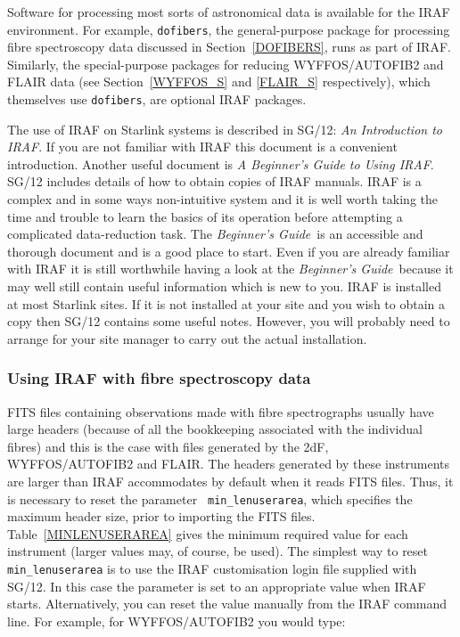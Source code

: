\documentclass[twoside,11pt]{article}
\newcommand{\xref}[3]{#1}
\begin{document}
Software for processing most sorts of astronomical data is available
for the IRAF environment.  For example, {\tt dofibers}, the
general-purpose package for processing fibre spectroscopy data
discussed in Section~\ref{DOFIBERS}, runs as part of IRAF.  Similarly,
the special-purpose packages for reducing WYFFOS/AUTOFIB2 and FLAIR
data (see Section~\ref{WYFFOS_S} and \ref{FLAIR_S} respectively),
which themselves use {\tt dofibers}, are optional IRAF packages.

The use of IRAF on Starlink systems is described in 
\xref{SG/12: {\it An Introduction to IRAF}}{sg12}{}\/\cite{SG12}.
If you are not familiar with IRAF this document is a convenient
introduction.  Another useful document is {\it A Beginner's Guide to
Using IRAF}\/\cite{BARNES93}.  SG/12 includes details of how to obtain
copies of IRAF manuals.  IRAF is a complex and in some ways
non-intuitive system and it is well worth taking the time and trouble
to learn the basics of its operation before attempting a complicated
data-reduction task.  The {\it Beginner's Guide}\, is an accessible and
thorough document and is a good place to start.  Even if you are already
familiar with IRAF it is still worthwhile having a look at the {\it
Beginner's Guide}\, because it may well still contain useful information
which is new to you.  IRAF is installed at most Starlink sites.
If it is not installed at your site and you wish to obtain a copy then
SG/12 contains some useful notes.  However, you will probably need to
arrange for your site manager to carry out the actual installation.

\subsubsection{\label{IRAFIBSP}Using IRAF with fibre spectroscopy data}

FITS files containing observations made with fibre spectrographs
usually have large headers (because of all the bookkeeping associated
with the individual fibres) and this is the case with files generated
by the 2dF, WYFFOS/AUTOFIB2 and FLAIR.  The headers generated by these
instruments are larger than IRAF accommodates by default when it reads
FITS files.  Thus, it is necessary to reset the parameter {\tt
min\_lenuserarea}, which specifies the maximum header size, prior
to importing the FITS files.  Table~\ref{MINLENUSERAREA} gives the
minimum required value for each instrument (larger values may, of
course, be used).  The simplest way to reset {\tt min\_lenuserarea} is
to use the IRAF customisation login file supplied with
\xref{SG/12}{sg12}{}\/\cite{SG12}.  In this case the parameter is set
to an appropriate value when IRAF starts.  Alternatively, you can reset
the value manually from the IRAF command line.  For example, for
WYFFOS/AUTOFIB2 you would type:
\end{document}
